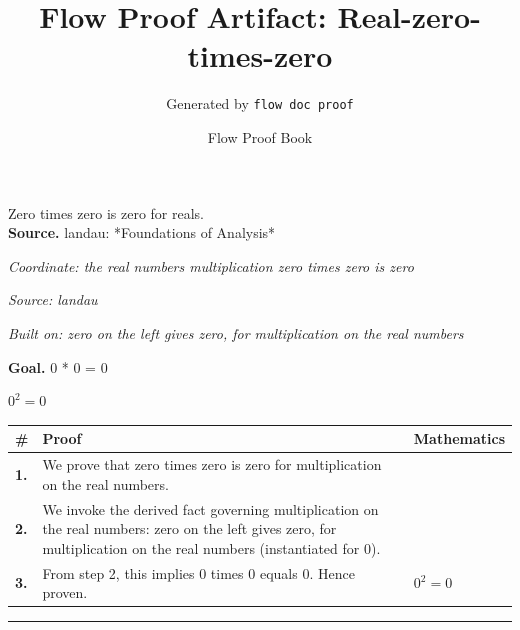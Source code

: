 \documentclass[11pt]{article}
\title{Flow Proof Artifact: Real-zero-times-zero}
\author{Generated by \texttt{flow doc proof}}
\date{Flow Proof Book}
\theoremstyle{definition}
\begin{document}
\maketitle
Zero times zero is zero for reals.\\[0.5em]
\textbf{Source.} landau: *Foundations of Analysis*\\[0.5em]
\bigskip
{}\par
\smallskip\noindent\textit{Coordinate: the real numbers \cdot multiplication \cdot zero times zero is zero}\par
\smallskip\noindent\textit{Source: landau}\par
\smallskip\noindent\textit{Built on: zero on the left gives zero, for multiplication on the real numbers}\par
\medskip
\noindent\textbf{Goal.} 0 * 0 = 0\par
\noindent$\displaystyle 0^{2} = 0$\par
\medskip
\noindent
\begin{tabular}{@{} >{\raggedright\arraybackslash}p{} >{\raggedright\arraybackslash}p{} >{\raggedleft\arraybackslash}p{} @{}}
\textbf{\#} & \textbf{Proof} & \textbf{Mathematics} \\
\midrule
\textbf{1.} & We prove that zero times zero is zero for multiplication on the real numbers. & \\[0.45em]
\textbf{2.} & We invoke the derived fact governing multiplication on the real numbers: zero on the left gives zero, for multiplication on the real numbers (instantiated for 0). & \\[0.45em]
\textbf{3.} & From step 2, this implies 0 times 0 equals 0. Hence proven. & $\displaystyle 0^{2} = 0$ \\[0.45em]
\bottomrule
\end{tabular}
\label{thm:Real-multiplication-zero_times_zero_is_zero}
\par\medskip\hrule
\end{document}
